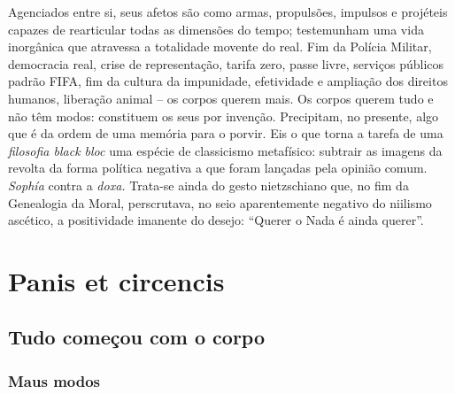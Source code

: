 Agenciados entre si, seus afetos são como armas, propulsões, impulsos e
projéteis capazes de rearticular todas as dimensões do tempo;
testemunham uma vida inorgânica que atravessa a totalidade movente do
real. Fim da Polícia Militar, democracia real, crise de representação,
tarifa zero, passe livre, serviços públicos padrão FIFA, fim da cultura
da impunidade, efetividade e ampliação dos direitos humanos, liberação
animal -- os corpos querem mais. Os corpos querem tudo e não têm modos:
constituem os seus por invenção. Precipitam, no presente, algo que é da
ordem de uma memória para o porvir. Eis o que torna a tarefa de uma
\emph{filosofia black bloc} uma espécie de classicismo metafísico:
subtrair as imagens da revolta da forma política negativa a que foram
lançadas pela opinião comum. \emph{Sophía} contra a \emph{doxa.}
Trata-se ainda do gesto nietzschiano que, no fim da Genealogia da Moral,
perscrutava, no seio aparentemente negativo do niilismo ascético, a
positividade imanente do desejo: ``Querer o Nada é ainda querer''.

\chapter{Panis et circencis}


\section{Tudo começou com o corpo}

\subsection{Maus modos}

